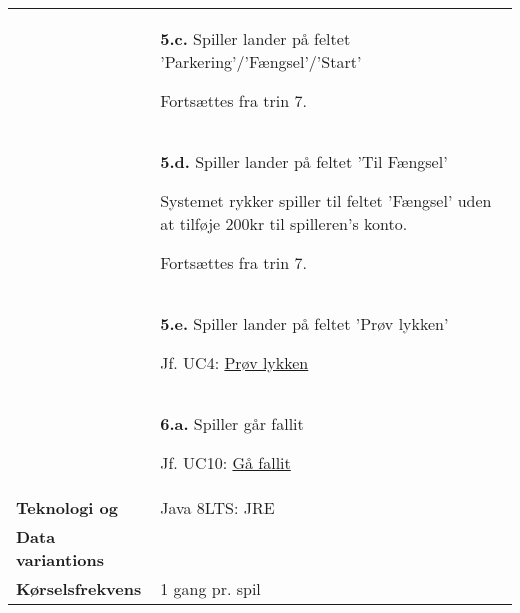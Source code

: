 \documentclass[class=article, crop=false]{standalone}
\begin{document}
\begin{table}[H]
\begin{tabularx}{\textwidth}{|l|X|}
                            & \textbf{5.c.} Spiller lander på feltet 'Parkering'/'Fængsel'/'Start'
                            \begin{enumerate} \begin{tabenum}
                                                  \item Fortsættes fra trin 7.
                            \end{tabenum} \end{enumerate}
                            \\


                            & \textbf{5.d.} Spiller lander på feltet 'Til Fængsel'
                            \begin{enumerate} \begin{tabenum}
                                                  \item Systemet rykker spiller til feltet 'Fængsel' uden at tilføje 200kr til spilleren's konto.
                                                  \item Fortsættes fra trin 7.
                            \end{tabenum} \end{enumerate}
                            \\


                            & \textbf{5.e.} Spiller lander på feltet 'Prøv lykken'
                            \begin{enumerate} \begin{tabenum}
                                                  \item Jf. UC4: \underline{Prøv lykken}
                            \end{tabenum} \end{enumerate}
                            \\

                            & \textbf{6.a.} Spiller går fallit
                            \begin{enumerate} \begin{tabenum}
                                                  \item Jf. UC10: \underline{Gå fallit}
                            \end{tabenum} \end{enumerate}
                            \\


            \hline








            \textbf{Teknologi og}     & Java 8LTS: JRE \\
            \textbf{Data variantions} &  \\ \hline
            \textbf{Kørselsfrekvens} & 1 gang pr. spil\\ \hline
        \end{tabularx}


    \end{table}
\end{document}
